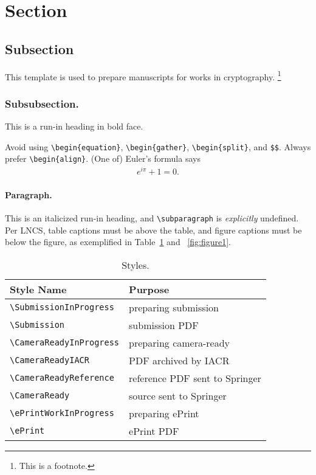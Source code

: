 \section{Section}
\subsection{Subsection}

This template is used to prepare manuscripts for works in cryptography.%
\footnote{This is a footnote.}

\subsubsection{Subsubsection.}
This is a run-in heading in bold face.

Avoid using \texttt{\textbackslash begin\{equation\}},
\texttt{\textbackslash begin\{gather\}},
\texttt{\textbackslash begin\{split\}},
and \texttt{\$\$}.
Always prefer \texttt{\textbackslash begin\{align\}}.
(One of) Euler's formula says
\begin{align*}
e^{i\pi}+1=0.
\end{align*}

\paragraph{Paragraph.}
This is an italicized run-in heading, and
\texttt{\textbackslash subparagraph} is \emph{explicitly} undefined.
Per LNCS, table captions must be above the table,
and figure captions must be below the figure,
as exemplified in Table~\ref{tab:table1} and \Figure~\ref{fig:figure1}.

\begin{table}[h]
\centering
\caption{Styles.}
\label{tab:table1}
\begin{tabular}{ll}
\toprule
Style Name & Purpose \\
\midrule
\texttt{\textbackslash SubmissionInProgress} &
preparing submission \\
\texttt{\textbackslash Submission} &
submission PDF \\
\texttt{\textbackslash CameraReadyInProgress} &
preparing camera-ready \\
\texttt{\textbackslash CameraReadyIACR} &
PDF archived by IACR \\
\texttt{\textbackslash CameraReadyReference} &
reference PDF sent to Springer \\
\texttt{\textbackslash CameraReady} &
source sent to Springer \\
\texttt{\textbackslash ePrintWorkInProgress} &
preparing ePrint \\
\texttt{\textbackslash ePrint} &
ePrint PDF \\
\bottomrule
\end{tabular}
\end{table}

